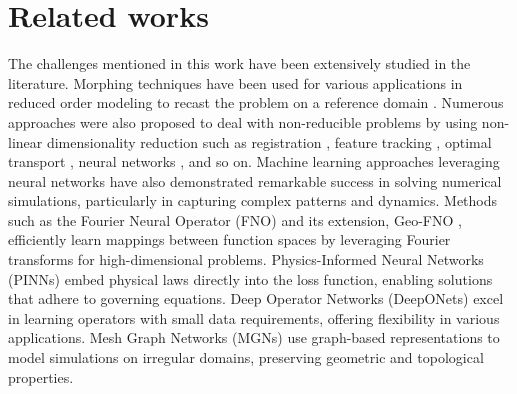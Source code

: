 \section{Related works}
The challenges mentioned in this work have been extensively studied in the literature. Morphing techniques have been used for various applications in reduced order modeling to recast the problem on a reference domain \cite{porziani2021automatic,axelsson2015continuation,ye2024data}. Numerous approaches were also proposed to deal with non-reducible problems by using non-linear dimensionality reduction such as registration \cite{taddei2020registration,taddei2023compositional}, feature tracking \cite{mirhoseini2023model}, optimal transport \cite{cucchiara2024model}, neural networks \cite{lee2020model,fresca2022pod,barnett2023neural,berman2024colora}, and so on. Machine learning approaches leveraging neural networks have also demonstrated remarkable success in solving numerical simulations, particularly in capturing complex patterns and dynamics. Methods such as the Fourier Neural Operator (FNO) \cite{li2020fourier} and its extension, Geo-FNO \cite{li2023fourier}, efficiently learn mappings between function spaces by leveraging Fourier transforms for high-dimensional problems. Physics-Informed Neural Networks (PINNs) \cite{raissi2019physics} embed physical laws directly into the loss function, enabling solutions that adhere to governing equations. Deep Operator Networks (DeepONets) \cite{lu2021learning} excel in learning operators with small data requirements, offering flexibility in various applications. Mesh Graph Networks (MGNs) \cite{pfaff2020learning} use graph-based representations to model simulations on irregular domains, preserving geometric and topological properties.